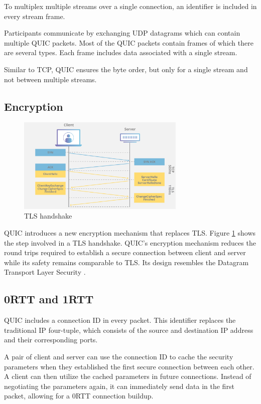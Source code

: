 \documentclass[conference]{IEEEtran}
\begin{document}
To multiplex multiple streams over a single connection, an identifier is included in every stream frame.

Participants communicate by exchanging UDP datagrams which can contain multiple QUIC packets. Most of the QUIC packets contain frames of which there are several types. Each frame includes data associated with a single stream.

Similar to TCP, QUIC ensures the byte order, but only for a single stream and not between multiple streams.

\subsection{Encryption}

\begin{figure}[htbp]
\includegraphics[width=8cm,keepaspectratio]{images/TLS handshake.png}
\caption{TLS handshake \cite{CloudflareTlsHandshake}}
\label{fig:tls-handshake}
\end{figure}

QUIC introduces a new encryption mechanism that replaces TLS. Figure \ref{fig:tls-handshake} shows the step involved in a TLS handshake. QUIC's encryption mechanism reduces the round trips required to establish a secure connection between client and server while its safety remains comparable to TLS. Its design resembles the Datagram Transport Layer Security \cite{HowQuickIsQuic}.

\subsection{0RTT and 1RTT}
QUIC includes a connection ID in every packet. This identifier replaces the traditional IP four-tuple, which consists of the source and destination IP address and their corresponding ports.

A pair of client and server can use the connection ID to cache the security parameters when they established the first secure connection between each other. A client can then utilize the cached parameters in future connections. Instead of negotiating the parameters again, it can immediately send data in the first packet, allowing for a 0RTT connection buildup.
\end{document}
